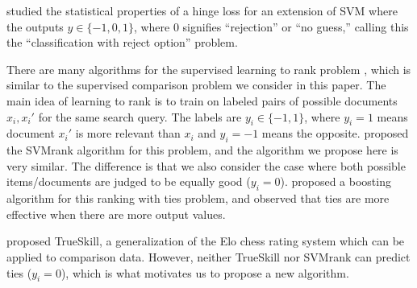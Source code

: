 \documentclass{article}
\newcommand{\RR}{\mathbb R}
\begin{document}
\citet{reject-option} studied the statistical properties of a hinge
loss for an extension of SVM where the outputs $y\in\{-1,0,1\}$, where
0 signifies ``rejection'' or ``no guess,'' calling this the
``classification with reject option'' problem.

There are many algorithms for the supervised learning to rank problem
\citep{learning-to-rank}, which is similar to the supervised
comparison problem we consider in this paper. The main idea of
learning to rank is to train on labeled pairs of possible documents
$x_i,x_i'$ for the same search query. The labels are $y_i\in\{-1,1\}$,
where $y_i=1$ means document $x_i'$ is more relevant than $x_i$ and
$y_i=-1$ means the opposite. \citet{ranksvm} proposed the SVMrank
algorithm for this problem, and the algorithm we propose here is very
similar. The difference is that we also consider the case where both
possible items/documents are judged to be equally good ($y_i=0$).
\citet{rank-with-ties} proposed a boosting algorithm for this ranking
with ties problem, and observed that ties are more effective when
there are more output values.

\citet{trueskill} proposed TrueSkill, a generalization of the Elo
chess rating system which can be applied to comparison data. However,
neither TrueSkill nor SVMrank can predict ties ($y_i=0$), which is
what motivates us to propose a new algorithm.

%   

\end{document}
